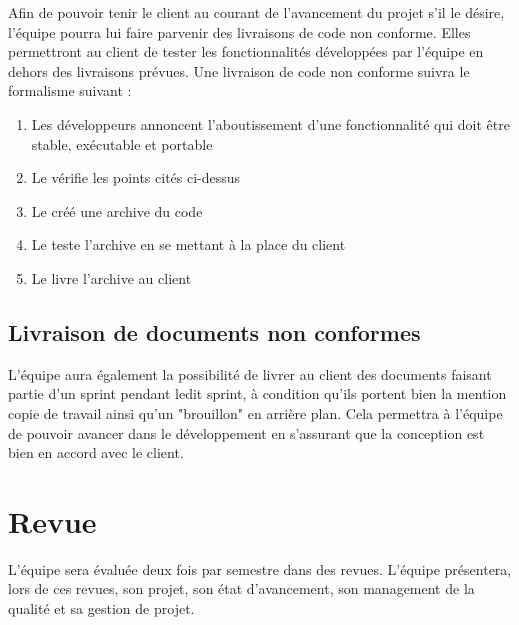 Afin de pouvoir tenir le client au courant de l’avancement du projet s’il le désire, l’équipe \nomEquipe{} pourra lui faire parvenir des livraisons de code non conforme. Elles permettront au client de tester les fonctionnalités développées par l’équipe en dehors des livraisons prévues. Une livraison de code non conforme suivra le formalisme suivant :
\begin{enumerate}
\item Les développeurs annoncent l’aboutissement d’une fonctionnalité qui doit être stable, exécutable et portable 
\item Le \RD{} vérifie les points cités ci-dessus
\item Le \RD{} créé une archive du code
\item Le \CP{} teste l’archive en se mettant à la place du client
\item Le \CP{} livre l’archive au client

\end{enumerate}

\subsection{Livraison de documents non conformes}

L’équipe \nomEquipe{} aura également la possibilité de livrer au client des documents faisant partie d’un sprint pendant ledit sprint, à condition qu’ils portent bien la mention copie de travail ainsi qu’un "brouillon" en arrière plan. Cela permettra à l’équipe de pouvoir avancer dans le développement en s’assurant que la conception est bien en accord avec le client.

\section{Revue}
\label{revue}

L’équipe \PICCourt sera évaluée deux fois par semestre dans des revues. L’équipe présentera, lors de ces revues, son projet, son état d’avancement, son management de la qualité et sa gestion de projet.



